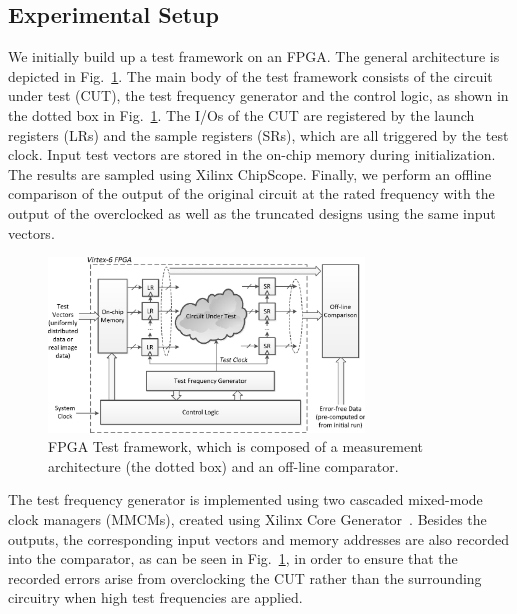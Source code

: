 \documentclass[journal]{IEEEtran}
\begin{document}
\subsection{Experimental Setup} %
\label{sub:experimental_setup}
We initially build up a test framework on an FPGA. The general architecture is depicted in Fig.~\ref{Test Framework}. The main body of the test framework consists of the circuit under test (CUT), the test frequency generator and the control logic, as shown in the dotted box in Fig.~\ref{Test Framework}. The I/Os of the CUT are registered by the launch registers (LRs) and the sample registers (SRs), which are all triggered by the test clock. Input test vectors are stored in the on-chip memory during initialization. The results are sampled using Xilinx ChipScope. Finally, we perform an offline comparison of the output of the original circuit at the rated frequency with the output of the overclocked as well as the truncated designs using the same input vectors.
%
\begin{figure}[htbp]
  \centering
  \includegraphics[width=3.3in]{./Figures/TestFramework2.eps}
  \caption{FPGA Test framework, which is composed of a measurement architecture (the dotted box) and an off-line comparator.}
  \label{Test Framework}
\end{figure}

The test frequency generator is implemented using two cascaded mixed-mode clock managers (MMCMs), created using Xilinx Core Generator~\cite{Virtex6Clocking}. Besides the outputs, the corresponding input vectors and memory addresses are also recorded into the comparator, as can be seen in Fig.~\ref{Test Framework}, in order to ensure that the recorded errors arise from overclocking the CUT rather than the surrounding circuitry when high test frequencies are applied.

\end{document}

